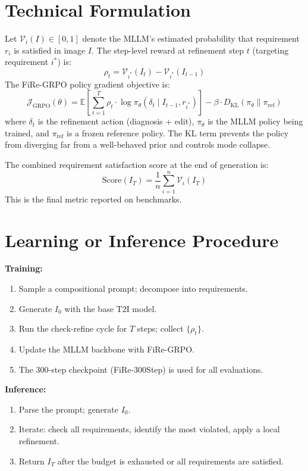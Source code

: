 \documentclass[10pt,twocolumn]{article}
\begin{document}
\section{Technical Formulation}

Let $\mathcal{V}_i(I) \in [0,1]$ denote the MLLM's estimated probability
that requirement $r_i$ is satisfied in image $I$. The step-level reward at
refinement step $t$ (targeting requirement $i^*$) is:
\[
\rho_t = \mathcal{V}_{i^*}(I_t) - \mathcal{V}_{i^*}(I_{t-1})
\]
The FiRe-GRPO policy gradient objective is:
\[
\mathcal{J}_{\text{GRPO}}(\theta)
  = \mathbb{E}\!\left[\sum_{t=1}^T \rho_t \cdot \log \pi_\theta(\delta_t \mid I_{t-1}, r_{i^*})\right]
  - \beta \cdot D_{\text{KL}}(\pi_\theta \| \pi_{\text{ref}})
\]
where $\delta_t$ is the refinement action (diagnosis + edit), $\pi_\theta$ is
the MLLM policy being trained, and $\pi_{\text{ref}}$ is a frozen reference
policy. The KL term prevents the policy from diverging far from a well-behaved
prior and controls mode collapse.

The combined requirement satisfaction score at the end of generation is:
\[
\text{Score}(I_T) = \frac{1}{n} \sum_{i=1}^n \mathcal{V}_i(I_T)
\]
This is the final metric reported on benchmarks.

\section{Learning or Inference Procedure}

\textbf{Training:}
\begin{enumerate}[itemsep=2pt,parsep=0pt]
  \item Sample a compositional prompt; decompose into requirements.
  \item Generate $I_0$ with the base T2I model.
  \item Run the check-refine cycle for $T$ steps; collect $\{\rho_t\}$.
  \item Update the MLLM backbone with FiRe-GRPO.
  \item The 300-step checkpoint (FiRe-300Step) is used for all evaluations.
\end{enumerate}

\textbf{Inference:}
\begin{enumerate}[itemsep=2pt,parsep=0pt]
  \item Parse the prompt; generate $I_0$.
  \item Iterate: check all requirements, identify the most violated,
    apply a local refinement.
  \item Return $I_T$ after the budget is exhausted or all requirements
    are satisfied.
\end{enumerate}
\end{document}
